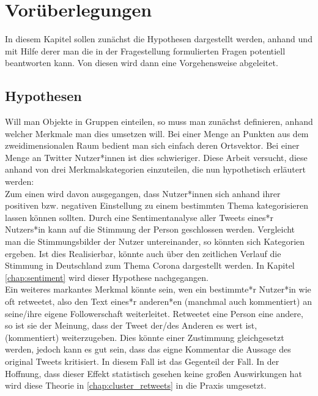 \chapter{Vorüberlegungen}
\label{chap:voruberlegungen}
In diesem Kapitel sollen zunächst die Hypothesen dargestellt werden, anhand und mit Hilfe derer man die in der Fragestellung formulierten Fragen potentiell beantworten kann. Von diesen wird dann eine Vorgehensweise abgeleitet.
\section{Hypothesen}
\label{sec:hypothesen}
Will man Objekte in Gruppen einteilen, so muss man zunächst definieren, anhand welcher Merkmale man dies umsetzen will. Bei einer Menge an Punkten aus dem zweidimensionalen Raum bedient man sich einfach deren Ortsvektor. Bei einer Menge an Twitter Nutzer*innen  ist dies schwieriger. Diese Arbeit versucht, diese anhand von drei Merkmalskategorien einzuteilen, die nun hypothetisch erläutert werden: \\ \newline
Zum einen wird davon ausgegangen, dass Nutzer*innen sich anhand ihrer positiven bzw. negativen Einstellung zu einem bestimmten Thema kategorisieren lassen können sollten. Durch eine Sentimentanalyse aller Tweets eines*r Nutzers*in kann auf die Stimmung der Person geschlossen werden. Vergleicht man die Stimmungsbilder der Nutzer untereinander, so könnten sich Kategorien ergeben. Ist dies Realisierbar, könnte auch über den zeitlichen Verlauf die Stimmung in Deutschland zum Thema Corona dargestellt werden. In Kapitel \ref{chap:sentiment} wird dieser Hypothese nachgegangen. \\ \newline
Ein weiteres markantes Merkmal könnte sein, wen ein bestimmte*r Nutzer*in wie oft retweetet, also den Text eines*r anderen*en  (manchmal auch kommentiert) an seine/ihre eigene Followerschaft weiterleitet. Retweetet eine Person eine andere, so ist sie der Meinung, dass der Tweet der/des Anderen es wert ist, (kommentiert) weiterzugeben. Dies könnte einer Zustimmung gleichgesetzt werden, jedoch kann es gut sein, dass das eigne Kommentar die Aussage des original Tweets kritisiert. In diesem Fall ist das Gegenteil der Fall. In der Hoffnung, dass dieser Effekt statistisch gesehen keine großen Auswirkungen hat wird diese Theorie in \ref{chap:cluster_retweets} in die Praxis umgesetzt. \\ \newline
